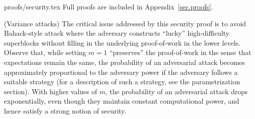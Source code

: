 \ifonecolumn
{proofs/security.tex}
\else
Full proofs are included in Appendix~\ref{sec.proofs}.
\fi

\begin{remark}{(Variance attacks)}
    \label{rmk.variance}
    The critical issue addressed by this security proof is to avoid Bahack-style
    attack \cite{bahack} where the adversary constructs ``lucky'' high-difficulty
    superblocks without filling in the underlying proof-of-work in the lower
    levels. Observe that, while setting $m = 1$ ``preserves'' the proof-of-work in
    the sense that expectations remain the same, the probability of an adversarial
    attack becomes approximately proportional to the adversary power if the
    adversary follows a suitable strategy (for a description of such a strategy,
    see the parametrization section). With higher values of $m$, the probability of
    an adversarial attack drops exponentially, even though they maintain constant
    computational power, and hence satisfy a strong notion of security.
\end{remark}
